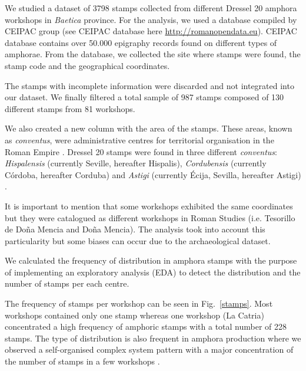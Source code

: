 \documentclass[review]{elsarticle}
\begin{document}
We studied a dataset of 3798 stamps collected from different Dressel 20 amphora workshops in \textit{Baetica} province. For the analysis, we used a database compiled by CEIPAC group 
\citep{remesal_centro_2015} (see CEIPAC database here \url{http://romanopendata.eu}). CEIPAC database contains over 50.000 epigraphy records found on different types of amphorae. From the database, we collected the site where stamps were found, the stamp code and the geographical coordinates. 

The stamps with incomplete information were discarded and not integrated into our dataset. We finally filtered a total sample of 987 stamps composed of 130 different stamps from 81 workshops. 


We also created a new column with the area of the stamps. These areas, known as \textit{conventus}, were administrative centres for territorial organisation in the Roman Empire \citep[58]{ozcariz_gil_administracion_2013}.
Dressel 20 stamps were found in three different \textit{conventus}: \textit{Hispalensis} (currently Seville, hereafter Hispalis), \textit{Cordubensis} (currently C\'ordoba, hereafter Corduba) and \textit{Astigi} (currently Écija, Sevilla, hereafter Astigi) \citep{rodriguez_economioleicola_1977,
chicdatos2001,berni_millet_epigrafianforica_2008} . 


It is important to mention that some workshops exhibited the same coordinates but they were catalogued as different workshops in Roman Studies (i.e. Tesorillo de Doña Mencia and Doña Mencia). The analysis took into account this particularity but some biases can occur due to the archaeological dataset. 

We calculated the frequency of distribution in amphora stamps with the purpose of implementing an exploratory analysis (EDA) to detect the distribution and the number of stamps per each centre.  

The frequency of stamps per workshop can be seen in Fig.~\ref{stamps}. Most 
workshops contained only one stamp whereas one workshop (La Catria) concentrated a high frequency of amphoric stamps with a total number of 228 stamps. The type of distribution is also frequent in amphora production where we observed a self-organised complex system pattern with a major concentration of the number of stamps in a few workshops \citep{bayesian_2018,coto-sarmiento_identifying_2018}.
\end{document}
